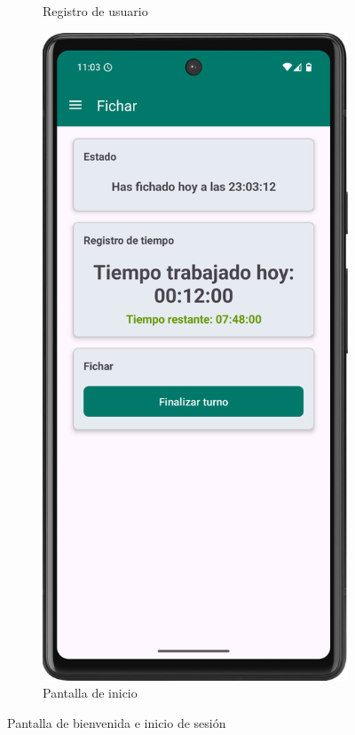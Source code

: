 \begin{figure}[H]
\begin{subfigure}[b]{0.3\textwidth}
         \caption{Registro de usuario}
         \label{fig:signup}
     \end{subfigure}
     \hfill
     \begin{subfigure}[b]{0.3\textwidth}
         \centering
         \includegraphics[width=\textwidth]{root/fichado.png}
         \caption{Pantalla de inicio}
         \label{fig:fichado}
     \end{subfigure}
        \caption{Pantalla de bienvenida e inicio de sesión}
        \label{fig:bienvenida}
\end{figure}


